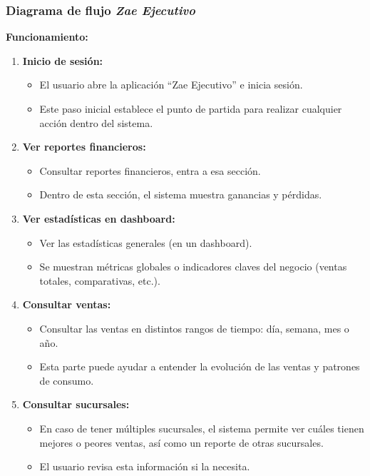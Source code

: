 \documentclass[protocolo.tex]{subfiles}
\begin{document}
\subsubsection{Diagrama de flujo \textit{Zae Ejecutivo}}
\textbf{Funcionamiento:}
\begin{enumerate}
    \item \textbf{Inicio de sesión: }  
    \begin{itemize}
        \item El usuario abre la aplicación “Zae Ejecutivo” e inicia sesión.
        \item Este paso inicial establece el punto de partida para realizar cualquier acción dentro del sistema.
        
    \end{itemize}
    \item \textbf{Ver reportes financieros:}  
    \begin{itemize}
        \item Consultar reportes financieros, entra a esa sección.
        \item Dentro de esta sección, el sistema muestra ganancias y pérdidas.
        
        
    \end{itemize}
    \item \textbf{Ver estadísticas en dashboard:}  
    \begin{itemize}
        \item Ver las estadísticas generales (en un dashboard).
        \item Se muestran métricas globales o indicadores claves del negocio (ventas totales, comparativas, etc.).
        
        
    \end{itemize}
    \item \textbf{Consultar ventas:} 
    \begin{itemize}
        \item Consultar las ventas en distintos rangos de tiempo: día, semana, mes o año.
        \item Esta parte puede ayudar a entender la evolución de las ventas y patrones de consumo.
        
        
    \end{itemize}
    \item \textbf{Consultar sucursales:} 
    \begin{itemize}
        \item En caso de tener múltiples sucursales, el sistema permite ver cuáles tienen mejores o peores ventas, así como un reporte de otras sucursales.
        \item El usuario revisa esta información si la necesita.
        

\end{itemize}
\end{enumerate}
\end{document}
